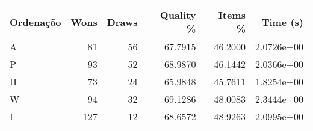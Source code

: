 \begin{tabular}{lrrrrr}
    \hline
    Ordenação & Wons & Draws & Quality \% & Items \% & Time (s)   \\
    \hline
    A         & 81   & 56    & 67.7915    & 46.2000  & 2.0726e+00 \\
    P         & 93   & 52    & 68.9870    & 46.1442  & 2.0366e+00 \\
    H         & 73   & 24    & 65.9848    & 45.7611  & 1.8254e+00 \\
    W         & 94   & 32    & 69.1286    & 48.0083  & 2.3444e+00 \\
    I         & 127  & 12    & 68.6572    & 48.9263  & 2.0995e+00 \\
    \hline
\end{tabular}